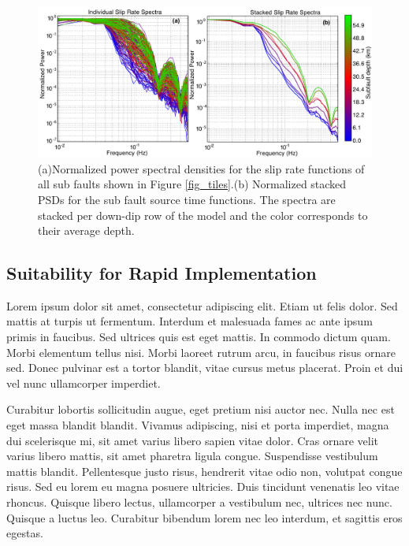 \begin{figure}[!ht] 
  \centering
  \includegraphics[width=0.99\linewidth]{./figures/ch4/stf_all.pdf}
    \caption[Source time function spectra]{(a)Normalized power spectral densities for the slip rate functions of all sub faults shown in Figure \ref{fig_tiles}.(b) Normalized stacked PSDs for the sub fault source time functions. The spectra are stacked per down-dip row of the model and the color corresponds to their average depth.}
  \label{fig_stfpsd}
\end{figure}



\subsection{Suitability for Rapid Implementation}



Lorem ipsum dolor sit amet, consectetur adipiscing elit. Etiam ut felis dolor. Sed mattis at turpis ut fermentum. Interdum et malesuada fames ac ante ipsum primis in faucibus. Sed ultrices quis est eget mattis. In commodo dictum quam. Morbi elementum tellus nisi. Morbi laoreet rutrum arcu, in faucibus risus ornare sed. Donec pulvinar est a tortor blandit, vitae cursus metus placerat. Proin et dui vel nunc ullamcorper imperdiet.

Curabitur lobortis sollicitudin augue, eget pretium nisi auctor nec. Nulla nec est eget massa blandit blandit. Vivamus adipiscing, nisi et porta imperdiet, magna dui scelerisque mi, sit amet varius libero sapien vitae dolor. Cras ornare velit varius libero mattis, sit amet pharetra ligula congue. Suspendisse vestibulum mattis blandit. Pellentesque justo risus, hendrerit vitae odio non, volutpat congue risus. Sed eu lorem eu magna posuere ultricies. Duis tincidunt venenatis leo vitae rhoncus. Quisque libero lectus, ullamcorper a vestibulum nec, ultrices nec nunc. Quisque a luctus leo. Curabitur bibendum lorem nec leo interdum, et sagittis eros egestas.

